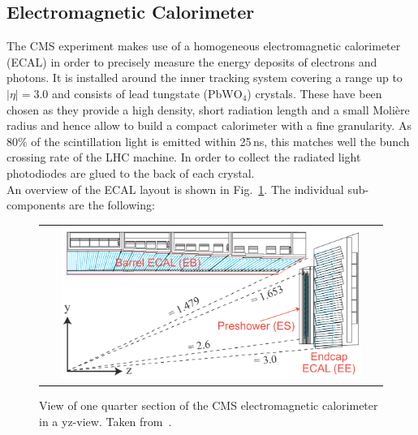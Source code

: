 \subsection{Electromagnetic Calorimeter}
\label{subsec:cms_ecal}
The CMS experiment makes use of a homogeneous electromagnetic calorimeter (ECAL) in order to precisely measure the energy deposits of electrons and photons. It is installed around the inner tracking system covering a range up to $|\eta| = 3.0$ and consists of lead tungstate (PbW$\mathrm{O}_4$) crystals. These have been chosen as they provide a high density, short radiation length and a small Moli\`{e}re radius and hence allow to build a compact calorimeter with a fine granularity. As 80\% of the scintillation light is emitted within 25\,ns, this matches well the bunch crossing rate of the LHC machine. In order to collect the radiated light photodiodes are glued to the back of each crystal. \\
An overview of the ECAL layout is shown in Fig.~\ref{fig:CMS_ecal}. The individual sub-components are the following:
\begin{figure}[!tp]
  \centering
  \begin{tabular}{c}
    \includegraphics[width=0.9\textwidth]{figures/Figures_Experimental_Apparatus_ECALRapidity.png}
  \end{tabular}
  \caption{View of one quarter section of the CMS electromagnetic calorimeter in a yz-view. Taken from~\cite{bib:cmsptdr1}.}
  \label{fig:CMS_ecal}
\end{figure}
